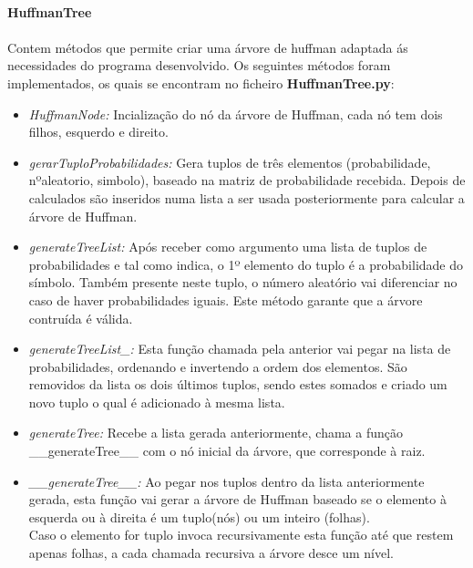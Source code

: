 \documentclass[paper=a4, fontsize=11pt]{scrartcl}
\numberwithin{equation}{section}		%
\numberwithin{figure}{section}			%
\numberwithin{table}{section}				%
\begin{document}
\paragraph{HuffmanTree}
\paragraph{}Contem métodos que permite criar uma árvore de huffman adaptada ás necessidades do programa desenvolvido. Os seguintes métodos foram implementados, os quais se encontram no ficheiro {\bf HuffmanTree.py}:\\

\begin{itemize}
  \item {\it HuffmanNode:} Incialização do nó da árvore de Huffman, cada nó tem dois filhos, esquerdo e direito.
  
  \item {\it gerarTuploProbabilidades:} Gera tuplos de três elementos (probabilidade, nºaleatorio, simbolo), baseado na matriz de probabilidade recebida. Depois de calculados são inseridos numa lista a ser usada posteriormente para calcular a árvore de Huffman.
  
  \item {\it generateTreeList:} Após receber como argumento uma lista de tuplos de probabilidades e tal como indica, o 1º elemento do tuplo é a probabilidade do símbolo. Também presente neste tuplo, o número aleatório vai diferenciar no caso de haver probabilidades iguais. Este método garante que a árvore contruída é válida.
  
  \item {\it generateTreeList\_:} Esta função chamada pela anterior vai pegar na lista de probabilidades, ordenando e invertendo a ordem dos elementos. São removidos da lista os dois últimos tuplos, sendo estes somados e criado um novo tuplo o qual é adicionado à mesma lista.
  
  \item {\it generateTree:} Recebe a lista gerada anteriormente, chama a função \_\_generateTree\_\_ com o nó inicial da árvore, que corresponde à raiz.
  
  \item {\it \_\_generateTree\_\_:} Ao pegar nos tuplos dentro da lista anteriormente gerada, esta função vai gerar a árvore de Huffman baseado se o elemento à esquerda ou à direita é um tuplo(nós) ou um inteiro (folhas).
  \\
  Caso o elemento for tuplo invoca recursivamente esta função até que restem apenas folhas, a cada chamada recursiva a árvore desce um nível.
  

\end{itemize}
\end{document}
